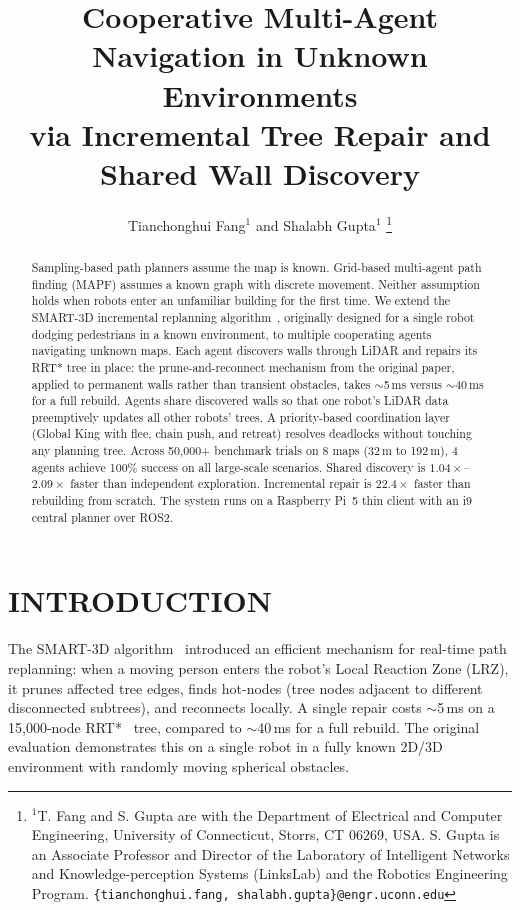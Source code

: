 \documentclass[letterpaper, 10pt, conference]{IEEEtran}
\title{\LARGE \bf
Cooperative Multi-Agent Navigation in Unknown Environments\\via Incremental Tree Repair and Shared Wall Discovery
}
\author{Tianchonghui Fang$^{1}$ and Shalabh Gupta$^{1}$%
\thanks{$^{1}$T. Fang and S. Gupta are with the Department of Electrical and Computer Engineering,
        University of Connecticut, Storrs, CT 06269, USA.
        S. Gupta is an Associate Professor and Director of the Laboratory of Intelligent Networks and Knowledge-perception Systems (LinksLab) and the Robotics Engineering Program.
        {\tt\small \{tianchonghui.fang, shalabh.gupta\}@engr.uconn.edu}}%
}
\newcommand{\smarttd}{SMART\nobreakdash-3D}
\begin{document}
\maketitle
\thispagestyle{empty}
\pagestyle{empty}

\begin{abstract}

Sampling-based path planners assume the map is known. Grid-based multi-agent path finding (MAPF) assumes a known graph with discrete movement. Neither assumption holds when robots enter an unfamiliar building for the first time. We extend the \smarttd{} incremental replanning algorithm~\cite{agrawal2025smart3d}, originally designed for a single robot dodging pedestrians in a known environment, to multiple cooperating agents navigating unknown maps. Each agent discovers walls through LiDAR and repairs its RRT* tree in place: the prune-and-reconnect mechanism from the original paper, applied to permanent walls rather than transient obstacles, takes ${\sim}$5\,ms versus ${\sim}$40\,ms for a full rebuild. Agents share discovered walls so that one robot's LiDAR data preemptively updates all other robots' trees. A priority-based coordination layer (Global King with flee, chain push, and retreat) resolves deadlocks without touching any planning tree. Across 50{,}000+ benchmark trials on 8 maps (32\,m to 192\,m), 4 agents achieve 100\% success on all large-scale scenarios. Shared discovery is $1.04\times$--$2.09\times$ faster than independent exploration. Incremental repair is $22.4\times$ faster than rebuilding from scratch. The system runs on a Raspberry Pi~5 thin client with an i9 central planner over ROS2.

\end{abstract}

\section{INTRODUCTION}

The \smarttd{} algorithm~\cite{agrawal2025smart3d} introduced an efficient mechanism for real-time path replanning: when a moving person enters the robot's Local Reaction Zone (LRZ), it prunes affected tree edges, finds hot-nodes (tree nodes adjacent to different disconnected subtrees), and reconnects locally. A single repair costs ${\sim}$5\,ms on a 15{,}000-node RRT*~\cite{karaman2011sampling} tree, compared to ${\sim}$40\,ms for a full rebuild. The original evaluation demonstrates this on a single robot in a fully known 2D/3D environment with randomly moving spherical obstacles.
\end{document}
